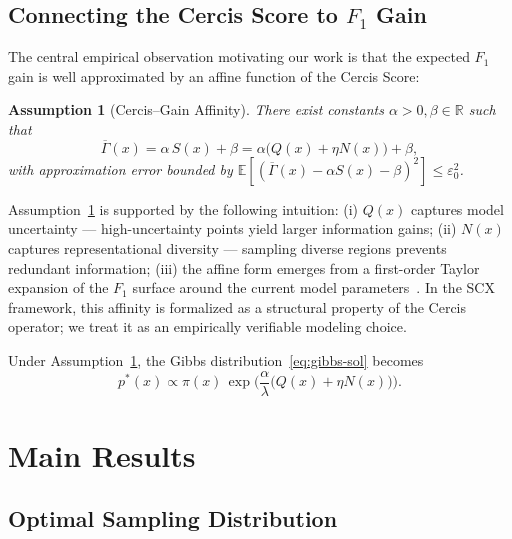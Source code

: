 \documentclass[12pt,a4paper]{article}
\newtheorem{assumption}[theorem]{Assumption}
\newcommand{\R}{\mathbb{R}}
\newcommand{\E}{\mathbb{E}}
\begin{document}
\subsection{Connecting the Cercis Score to $F_1$ Gain}

The central empirical observation motivating our work is that the expected
$F_1$ gain is well approximated by an affine function of the Cercis Score:

\begin{assumption}[Cercis--Gain Affinity]
\label{ass:affinity}
There exist constants $\alpha>0,\beta\in\R$ such that
\begin{equation}\label{eq:affinity}
    \overline{\Gamma}(x) = \alpha\,S(x) + \beta
    = \alpha\big(Q(x)+\eta N(x)\big) + \beta,
\end{equation}
with approximation error bounded by
$\E[(\overline{\Gamma}(x)-\alpha S(x)-\beta)^2]\leq\varepsilon_0^2$.
\end{assumption}

Assumption~\ref{ass:affinity} is supported by the following intuition: (i)
$Q(x)$ captures model uncertainty — high-uncertainty points yield larger
information gains; (ii) $N(x)$ captures representational diversity —
sampling diverse regions prevents redundant information; (iii) the affine
form emerges from a first-order Taylor expansion of the $F_1$ surface around
the current model parameters~\citep{ash2020warm}.  In the SCX framework, this
affinity is formalized as a structural property of the Cercis operator; we
treat it as an empirically verifiable modeling choice.

\medskip\noindent
Under Assumption~\ref{ass:affinity}, the Gibbs distribution~\eqref{eq:gibbs-sol}
becomes
\begin{equation}\label{eq:p-star}
    p^*(x) \propto \pi(x)\,
    \exp\!\Big(\frac{\alpha}{\lambda}\big(Q(x)+\eta N(x)\big)\Big).
\end{equation}

\section{Main Results}

\subsection{Optimal Sampling Distribution}
\end{document}

